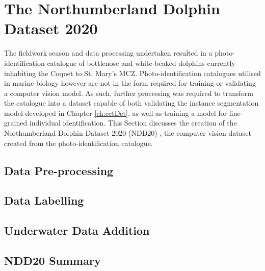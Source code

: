\section{The Northumberland Dolphin Dataset 2020}\label{ch:NDD,sec:NDD20}

The fieldwork season and data processing undertaken resulted in a photo-identification catalogue of bottlenose and white-beaked dolphins currently inhabiting the Coquet to St. Mary's MCZ. Photo-identification catalogues utilised in marine biology however are not in the form required for training or validating a computer vision model. As such, further processing was required to transform the catalogue into a dataset capable of both validating the instance segmentation model developed in Chapter \ref{ch:cetDet}, as well as training a model for fine-grained individual identification. This Section discusses the creation of the Northumberland Dolphin Dataset 2020 (NDD20) \cite{trotter_ndd20_2020}, the computer vision dataset created from the photo-identification catalogue.

\subsection{Data Pre-processing}\label{ch:NDD,sec:NDD20,sub:dataPreprocessing}


\subsection{Data Labelling}\label{ch:NDD,sec:NDD20,sub:dataLabelling}


\subsection{Underwater Data Addition}\label{ch:NDD,sec:NDD20,sub:underwaterData}


\subsection{NDD20 Summary}\label{ch:NDD,sec:NDD20,sub:NDD20Summary}



